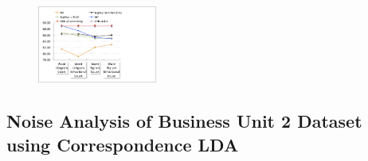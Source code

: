 \begin{figure}
\centering
\includegraphics[width=0.35\textwidth]{images/BU1-mean-micro-precision}
\label{Figure_BU1-predictions-feature-averages}
\end{figure}

\subsection{Noise Analysis of Business Unit 2 Dataset using Correspondence LDA}
\label{Subsect:BU2-noise-analysis}
